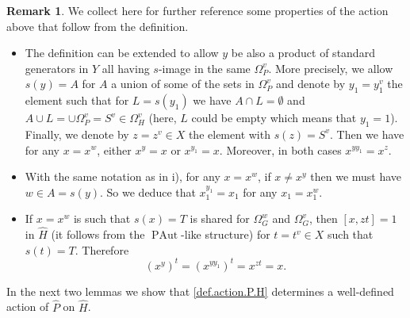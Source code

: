 \documentclass[10pt]{amsart}
\theoremstyle{definition}
\newtheorem{remark}[theorem]{Remark}
\newcommand{\PAut}{\operatorname{PAut}}
\theoremstyle{definition}
\numberwithin{equation}{section}
\begin{document}
\begin{remark}  \label{rem:action}
We collect here for further reference some properties of the action above that follow from the definition.
\begin{itemize}
\item[i)] The definition can be extended to allow $y$ be also a product of standard generators in $Y$ all having $s$-image in the same $\Omega_P^v$.  More precisely, we allow $s(y)=A$ for $A$ a union of some of the sets in $\Omega^v_P$ and denote by $y_1=y_1^v$ the element such that for $L=s(y_1)$ we have $A\cap L=\emptyset$ and $A\cup L=\cup\Omega^v_P=S^v\in\Omega^v_H$ (here, $L$ could be empty which means that $y_1=1$). Finally, we denote by $z=z^v\in X$ the element with $s(z)=S^v$. Then we have
for any $x=x^w$, either $x^y=x$ or $x^{y_1}=x$. Moreover, in both cases $x^{yy_1}=x^z$.


\item[ii)] With the same notation as in i), for any $x=x^w$, if $x\neq x^y$ then we must have $w\in A = s(y)$. So we deduce that $x_1^{y_1}=x_1$  for any $x_1=x_1^w$.

\item[iii)] If $x=x^w$ is such that $s(x)=T$ is shared for $\Omega_G^w$ and $\Omega_G^v$, then $[x,zt]=1$ in $\hat H$ (it follows from the $\PAut$-like structure) for $t=t^v\in X$ such that $s(t)=T$. Therefore
\[(x^y)^t=(x^{yy_1})^t=x^{zt}=x.\]
\end{itemize}
\end{remark}

In the next two lemmas we show that \eqref{def.action.P.H} determines a well-defined action of $\hat{P}$ on $\hat{H}$.
\end{document}
